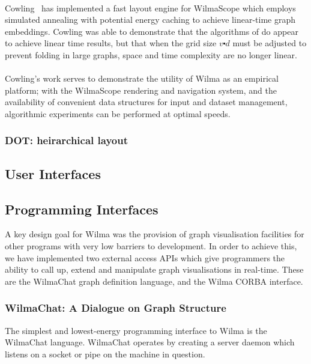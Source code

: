 \documentclass[runningheads]{cl2emult}
\begin{document}
\paragraph{}

Cowling~\cite{cowling02fast} has implemented a fast layout engine for
WilmaScope which employs simulated annealing with potential energy caching
to achieve linear-time graph embeddings.  Cowling was able to demonstrate
that the algorithms of \cite{davidson01noise} do appear to achieve linear
time results, but that when the grid size $v \centerdot d$ must be adjusted to
prevent folding in large graphs, space and time complexity are
no longer linear.

\paragraph{}

Cowling's work serves to demonstrate the utility of Wilma as an empirical
platform; with the WilmaScope rendering and navigation system, and the
availability of convenient data structures for input and dataset management,
algorithmic experiments can be performed at optimal speeds.

\subsubsection{DOT: heirarchical layout}
\subsection{User Interfaces}
\subsection{Programming Interfaces}

A key design goal for Wilma was the provision of graph visualisation
facilities for other programs with very low barriers to development.  In order
to achieve this, we have implemented two external access APIs which give
programmers the ability to call up, extend and manipulate graph visualisations
in real-time.  These are the WilmaChat graph definition language, and the
Wilma CORBA interface.

\subsubsection{WilmaChat: A Dialogue on Graph Structure}

The simplest and lowest-energy programming interface to Wilma is the WilmaChat
language.  WilmaChat operates by creating a server daemon which listens on a
socket or pipe on the machine in question.
\end{document}
